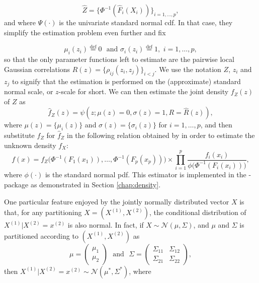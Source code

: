 \begin{equation}
\widehat Z = \{\Phi^{-1}(\widehat F_i(X_i))\}_{i=1,\ldots,p}, 
\label{eq:trans}
\end{equation}
and where $\Psi(\cdot)$ is the univariate standard normal cdf. In that case, they simplify the estimation problem even further and fix

\begin{equation}
\mu_i(z_i) \stackrel{\textrm{def}}{=} 0 \,\, \textrm{ and } \sigma_i(z_i) \stackrel{\textrm{def}}{=} 1, \,\, i = 1,\ldots,p,
\label{eq:simp}
\end{equation}
so that the only parameter functions left to estimate are the pairwise local Gaussian correlations $R(z) = \{\rho_{ij}(z_i, z_j)\}_{i<j}$. We use the notation $Z$, $z_i$ and $z_j$ to signify that the estimation is performed on the (approximate) standard normal scale, or $z$-scale for short. We can then estimate the joint density $f_Z(z)$ of $Z$ as
\begin{equation}
\widehat f_Z(z) = \psi(z; \mu(z) = 0, \sigma(z) = 1, R = \widehat R(z)),
\label{eq:transformed-density}
\end{equation}
where $\mu(z) = \{\mu_i(z)\}$ and $\sigma(z) = \{\sigma_i(z)\}$ for $i=1,\ldots,p$, and then substitute $f_Z$ for $\widehat f_Z$ in the following relation obtained by \citet{otne:tjos:2017} in order to estimate the unknown density $f_X$:
\begin{equation}
f(x) = f_{Z}\big(\Phi^{-1}(F_1(x_1)), \ldots, \Phi^{-1}(F_p(x_p))\big) \times \prod_{i=1}^p \frac{f_i(x_i)}{\phi\big(\Phi^{-1}(F_i(x_i))\big)},
\label{eq:backtrans}
\end{equation}
where $\phi(\cdot)$ is the standard normal pdf. This estimator is implemented in the -package as demonstrated in Section \ref{chap:density}.

One particular feature enjoyed by the jointly normally distributed vector $X$ is that, for any partitioning $X = \left(X^{(1)}, X^{(2)}\right)$, the conditional distribution of $X^{(1)}|X^{(2)} = x^{(2)}$ is also normal. In fact, if $X \sim \mathcal{N}(\mu,\Sigma)$, and $\mu$ and $\Sigma$ is partitioned according to $\left(X^{(1)}, X^{(2)}\right)$ as
$$\mu = \begin{pmatrix} \mu_1 \\\mu_2 \end{pmatrix} \,\, \textrm{ and } \,\, \Sigma = \begin{pmatrix} \Sigma_{11} & \Sigma_{12} \\ \Sigma_{21} & \Sigma_{22} \end{pmatrix},$$
then $X^{(1)}|X^{(2)} = x^{(2)} \sim \mathcal{N}(\mu^*, \Sigma^*)$, where


